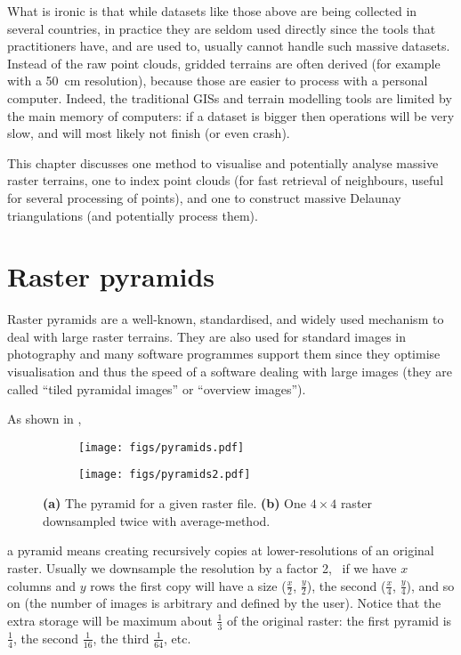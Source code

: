 %

What is ironic is that while datasets like those above are being collected in several countries, in practice they are seldom used directly since the tools that practitioners have, and are used to, usually cannot handle such massive datasets. 
Instead of the raw point clouds, gridded terrains are often derived (for example with a \qty{50}{cm} resolution), because those are easier to process with a personal computer.
Indeed, the traditional GISs and terrain modelling tools are limited by the main memory of computers: if a dataset is bigger then operations will be very slow, and will most likely not finish (or even crash).

%

This chapter discusses one method to visualise and potentially analyse massive raster terrains, one to index point clouds (for fast retrieval of neighbours, useful for several processing of points), and one to construct massive Delaunay triangulations (and potentially process them).



%
\section{Raster pyramids}%

Raster pyramids are a well-known, standardised, and widely used mechanism to deal with large raster terrains.
They are also used for standard images in photography and many software programmes support them since they optimise visualisation and thus the speed of a software dealing with large images (they are called ``tiled pyramidal images'' or ``overview images'').

As shown in , 
\begin{figure}
  \centering
  \begin{subfigure}[b]{0.65\linewidth}
    \centering
    \texttt{[image: figs/pyramids.pdf]}
    \caption{}
  \end{subfigure}
  \qquad%
  \begin{subfigure}[b]{0.2\linewidth}
    \centering
    \texttt{[image: figs/pyramids2.pdf]}
    \caption{}
  \end{subfigure}
\caption{\textbf{(a)} The pyramid for a given raster file. \textbf{(b)} One $4\times4$ raster downsampled twice with average-method.}%
\end{figure}
a pyramid means creating recursively copies at lower-resolutions of an original raster.
Usually we downsample the resolution by a factor 2,%
\ie\ if we have $x$ columns and $y$ rows the first copy will have a size ($\frac{x}{2}$, $\frac{y}{2}$), the second ($\frac{x}{4}$, $\frac{y}{4}$), and so on (the number of images is arbitrary and defined by the user).
Notice that the extra storage will be maximum about $\frac{1}{3}$ of the original raster: the first pyramid is $\frac{1}{4}$, the second $\frac{1}{16}$, the third $\frac{1}{64}$, etc.

